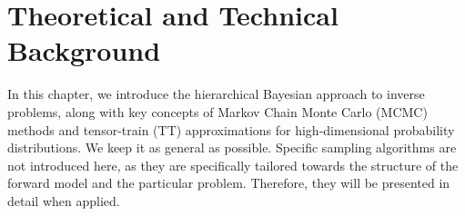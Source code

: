 \chapter{Theoretical and Technical Background}
\label{ch:background}
\thispagestyle{empty}
In this chapter, we introduce the hierarchical Bayesian approach to inverse problems, along with key concepts of Markov Chain Monte Carlo (MCMC) methods and tensor-train (TT) approximations for high-dimensional probability distributions.
We keep it as general as possible.
Specific sampling algorithms are not introduced here, as they are specifically tailored towards the structure of the forward model and the particular problem. Therefore, they will be presented in detail when applied.


